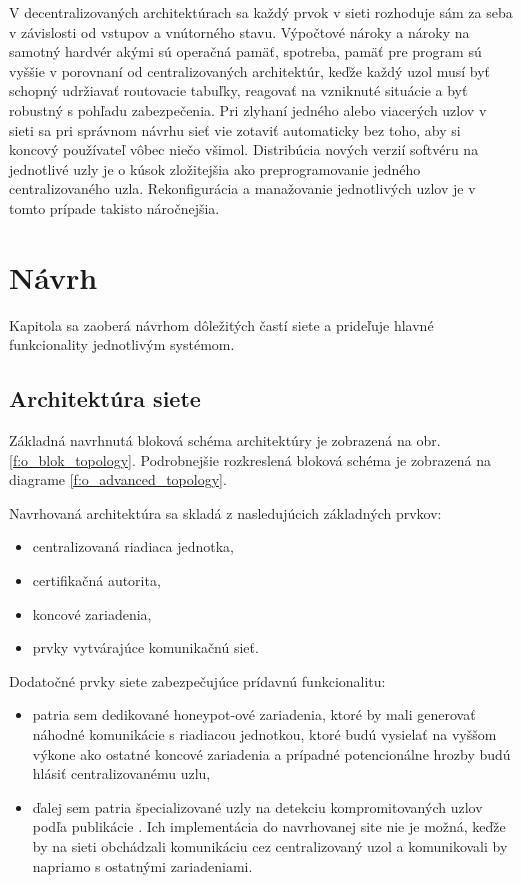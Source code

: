 \documentclass[12pt,a4paper,oneside,openright]{report}
\begin{document}
V decentralizovaných architektúrach sa každý prvok v sieti rozhoduje sám za seba v závislosti od vstupov a vnútorného stavu. Výpočtové nároky a nároky na samotný hardvér akými sú operačná pamäť, spotreba, pamäť pre program sú vyššie v porovnaní od centralizovaných architektúr, keďže každý uzol musí byť schopný udržiavať routovacie tabuľky, reagovať na vzniknuté situácie a byť robustný s pohľadu zabezpečenia. Pri zlyhaní jedného alebo viacerých uzlov v sieti sa pri správnom návrhu sieť vie zotaviť automaticky bez toho, aby si koncový používateľ vôbec niečo všimol. Distribúcia nových verzií softvéru na jednotlivé uzly je o kúsok zložitejšia ako preprogramovanie jedného centralizovaného uzla. Rekonfigurácia a manažovanie jednotlivých uzlov je v tomto prípade takisto náročnejšia.



\chapter{Návrh} \label{s_navrh}
Kapitola sa zaoberá návrhom dôležitých častí siete a prideľuje hlavné funkcionality jednotlivým systémom.

\section{Architektúra siete}
Základná navrhnutá bloková schéma architektúry je zobrazená na obr. \ref{f:o_blok_topology}. Podrobnejšie rozkreslená bloková schéma je zobrazená na diagrame \ref{f:o_advanced_topology}.

Navrhovaná architektúra sa skladá z nasledujúcich základných prvkov:
\singlespacing
\begin{itemize}
	\item centralizovaná riadiaca jednotka,
	\item certifikačná autorita,
	\item koncové zariadenia,
	\item prvky vytvárajúce komunikačnú sieť.
\end{itemize}
\onehalfspacing
Dodatočné prvky siete zabezpečujúce prídavnú funkcionalitu:
\singlespacing
\begin{itemize}
	\item patria sem dedikované honeypot-ové zariadenia, ktoré by mali generovať náhodné komunikácie s riadiacou jednotkou, ktoré budú vysielať na vyššom výkone ako ostatné koncové zariadenia a prípadné potencionálne hrozby budú hlásiť centralizovanému uzlu,
	\item ďalej sem patria špecializované uzly na detekciu kompromitovaných uzlov podľa publikácie \cite{compromisedsensors}. Ich implementácia do navrhovanej site nie je možná, keďže by na sieti obchádzali komunikáciu cez centralizovaný uzol a komunikovali by napriamo s ostatnými zariadeniami.
\end{itemize}
\onehalfspacing
\end{document}
